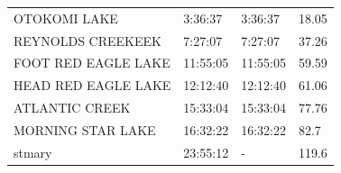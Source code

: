 \documentclass[12pt]{article}
\begin{document}
\begin{appendices}
\begin{table}[ht!]
\begin{tabular}{@{}llll@{}}
OTOKOMI LAKE                     & 3:36:37  & 3:36:37   & 18.05       \\
REYNOLDS CREEKEEK                & 7:27:07  & 7:27:07   & 37.26       \\
FOOT RED EAGLE LAKE              & 11:55:05 & 11:55:05  & 59.59       \\
HEAD RED EAGLE LAKE              & 12:12:40 & 12:12:40  & 61.06       \\
ATLANTIC CREEK                   & 15:33:04 & 15:33:04  & 77.76       \\
MORNING STAR LAKE                & 16:32:22 & 16:32:22  & 82.7        \\
stmary                           & 23:55:12 & -         & 119.6       \\ \bottomrule
\end{tabular}
\end{table}
\end{appendices}
\end{document}
